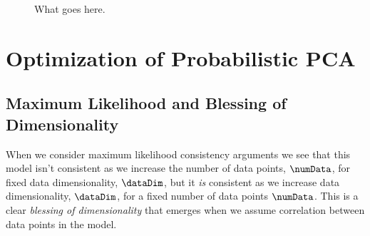 \begin{figure}
  \begin{center}
    
  \end{center}
  \caption{What goes here.}
\end{figure}




\section{Optimization of Probabilistic PCA}\label{sec:ppcaOptimize}



\subsection{Maximum Likelihood and Blessing of Dimensionality}

When we consider maximum likelihood consistency arguments \citep[see
e.g.][pg 126]{Wasserman:all03} we see that this model isn't consistent
as we increase the number of data points, $\numData$, for fixed data
dimensionality, $\dataDim$, but it \emph{is} consistent as we increase
data dimensionality, $\dataDim$, for a fixed number of data points
$\numData$. This is a clear \emph{blessing of dimensionality} that
emerges when we assume correlation between data points in the model.

